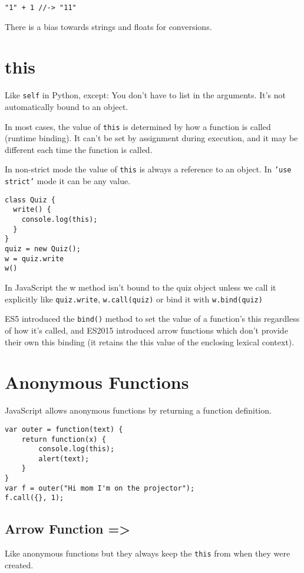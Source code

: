 \documentclass[../CMPUT-404-Notes.tex]{subfiles}
\begin{document}
\begin{verbatim}
"1" + 1 //-> "11"
\end{verbatim}
There is a bias towards strings and floats for conversions.

\section{this}
Like \texttt{self} in Python, except: You don't have to list in the arguments.
It's not automatically bound to an object.

In most cases, the value of \texttt{this} is determined by how a function is called (runtime binding). It can't be set by assignment during execution, and it may be different each time the function is called.

In non-strict mode the value of \texttt{this} is always a reference to an object. In \texttt{'use strict'} mode it can be any value. 

\begin{verbatim}
class Quiz {
  write() {
    console.log(this);
  }
}
quiz = new Quiz();
w = quiz.write
w()
\end{verbatim}

In JavaScript the w method isn't bound to the quiz object unless we call it explicitly like \texttt{quiz.write}, \texttt{w.call(quiz)} or bind it with \texttt{w.bind(quiz)}

ES5 introduced the \texttt{bind()} method to set the value of a function's this regardless of how it's called, and ES2015 introduced arrow functions which don't provide their own this binding (it retains the this value of the enclosing lexical context).

\section{Anonymous Functions}
JavaScript allows anonymous functions by returning a function definition.

\begin{verbatim}
var outer = function(text) {
    return function(x) {
        console.log(this);
        alert(text);
    }
}
var f = outer("Hi mom I'm on the projector");
f.call({}, 1);
\end{verbatim}


\subsection{Arrow Function =>}
Like anonymous functions but they always keep the \texttt{this} from when they were created.
\end{document}
